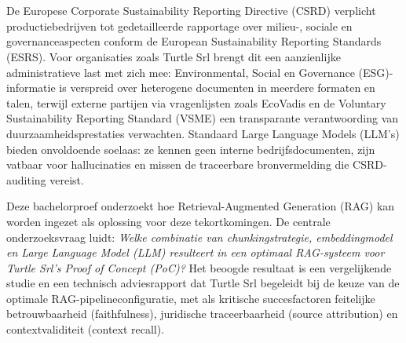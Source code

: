 
%
%
%
%
%


\chapter*{}

De Europese Corporate Sustainability Reporting Directive (CSRD) verplicht productiebedrijven tot gedetailleerde rapportage over milieu-, sociale en governanceaspecten conform de European Sustainability Reporting Standards (ESRS). Voor organisaties zoals Turtle Srl brengt dit een aanzienlijke administratieve last met zich mee: Environmental, Social en Governance (ESG)-informatie is verspreid over heterogene documenten in meerdere formaten en talen, terwijl externe partijen via vragenlijsten zoals EcoVadis en de Voluntary Sustainability Reporting Standard (VSME) een transparante verantwoording van duurzaamheidsprestaties verwachten. Standaard Large Language Models (LLM's) bieden onvoldoende soelaas: ze kennen geen interne bedrijfsdocumenten, zijn vatbaar voor hallucinaties en missen de traceerbare bronvermelding die CSRD-auditing vereist.

Deze bachelorproef onderzoekt hoe Retrieval-Augmented Generation (RAG) kan worden ingezet als oplossing voor deze tekortkomingen. De centrale onderzoeksvraag luidt: \textit{Welke combinatie van chunkingstrategie, embeddingmodel en Large Language Model (LLM) resulteert in een optimaal RAG-systeem voor Turtle Srl's Proof of Concept (PoC)?} Het beoogde resultaat is een vergelijkende studie en een technisch adviesrapport dat Turtle Srl begeleidt bij de keuze van de optimale RAG-pipelineconfiguratie, met als kritische succesfactoren feitelijke betrouwbaarheid (faithfulness), juridische traceerbaarheid (source attribution) en contextvaliditeit (context recall).

